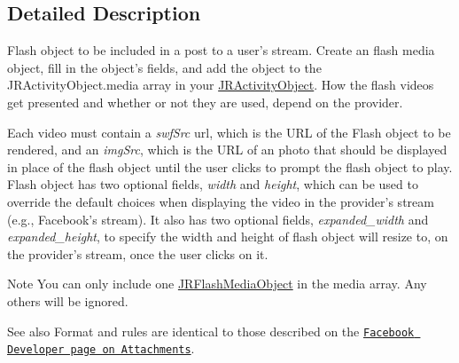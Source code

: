 \subsection{Detailed Description}
Flash object to be included in a post to a user's stream. Create an flash media object, fill in the object's fields, and add the object to the JRActivityObject.media array in your \hyperlink{classcom_1_1janrain_1_1android_1_1engage_1_1types_1_1_j_r_activity_object}{JRActivityObject}. How the flash videos get presented and whether or not they are used, depend on the provider.

Each video must contain a {\itshape swfSrc\/} url, which is the URL of the Flash object to be rendered, and an {\itshape imgSrc\/}, which is the URL of an photo that should be displayed in place of the flash object until the user clicks to prompt the flash object to play. Flash object has two optional fields, {\itshape width\/} and {\itshape height\/}, which can be used to override the default choices when displaying the video in the provider's stream (e.g., Facebook's stream). It also has two optional fields, {\itshape expanded\_\-width\/} and {\itshape expanded\_\-height\/}, to specify the width and height of flash object will resize to, on the provider's stream, once the user clicks on it.

\begin{DoxyNote}{Note}
You can only include one \hyperlink{classcom_1_1janrain_1_1android_1_1engage_1_1types_1_1_j_r_flash_media_object}{JRFlashMediaObject} in the media array. Any others will be ignored.
\end{DoxyNote}
\begin{DoxySeeAlso}{See also}
Format and rules are identical to those described on the \href{http://developers.facebook.com/docs/guides/attachments}{\tt Facebook Developer page on Attachments}. 
\end{DoxySeeAlso}


